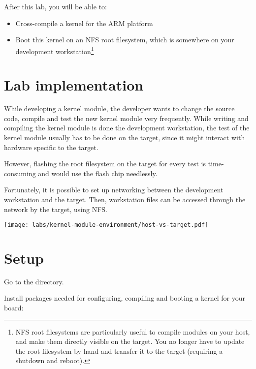 
After this lab, you will be able to:
\begin{itemize}

\item Cross-compile a kernel for the ARM platform

\item Boot this kernel on an NFS root filesystem, which is somewhere
on your development workstation\footnote{NFS root filesystems are
particularly useful to compile modules on your host, and make them
directly visible on the target. You no longer have to update the root
filesystem by hand and transfer it to the target (requiring a shutdown
and reboot).}

\end{itemize}

\section{Lab implementation}

While developing a kernel module, the developer wants to change the
source code, compile and test the new kernel module very
frequently. While writing and compiling the kernel module is done the
development workstation, the test of the kernel module usually has to
be done on the target, since it might interact with hardware specific
to the target.

However, flashing the root filesystem on the target for every test is
time-consuming and would use the flash chip needlessly.

Fortunately, it is possible to set up networking between the
development workstation and the target. Then, workstation files can be
accessed through the network by the target, using NFS.

\begin{center}
\texttt{[image: labs/kernel-module-environment/host-vs-target.pdf]}
\end{center}

\section{Setup}

Go to the  directory.

Install packages needed for configuring, compiling and booting
a kernel for your board:


